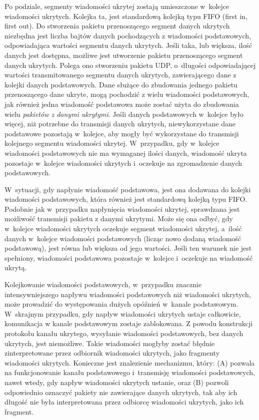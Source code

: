 \documentclass[a4paper, twoside, 12pt]{report}
\begin{document}
    Po podziale, segmenty wiadomości ukrytej zostają umieszczone w~kolejce wiadomości
    ukrytych. Kolejka ta, jest standardową kolejką typu FIFO (first in, first out).
    Do stworzenia pakietu przenoszącego segment danych ukrytych niezbędna jest
    liczba bajtów danych pochodzących z wiadomości podstawowych, odpowiadająca
    wartości segmentu danych ukrytych. Jeśli taka, lub większa, ilość danych jest dostępna,
    możliwe jest utworzenie pakietu przenoszącego segment danych ukrytych. Polega ono
    stworzeniu pakietu UDP, o~długości odpowiadającej wartości transmitowanego segmentu danych
    ukrytych, zawierającego dane z kolejki danych podstawowych. Dane służące do zbudowania
    jednego pakietu przenoszącego dane ukryte, mogą pochodzić z wielu wiadomości
    podstawowych, jak również jedna wiadomość podstawowa może zostać użyta do zbudowania
    wielu \emph{pakietów z danymi ukrytymi}. Jeśli danych podstawowych
    w~kolejce było więcej, niż potrzebne do transmisji danych ukrytych, niewykorzystane
    dane podstawowe pozostają w~kolejce, aby mogły być wykorzystane do transmisji
    kolejnego segmentu wiadomości ukrytej.
    W~przypadku, gdy w~kolejce wiadomości podstawowych nie ma wymaganej ilości
    danych, wiadomość ukryta pozostaje w~kolejce wiadomości ukrytych i~oczekuje
    na zgromadzenie danych podstawowych.

    W~sytuacji, gdy napłynie wiadomość podstawowa, jest ona dodawana do kolejki
    wiadomości podstawowych, która również jest standardową kolejką typu FIFO.
    Podobnie jak w~przypadku napłynięcia wiadomości ukrytej, sprawdzana jest możliwość
    transmisji pakietu z danymi ukrytymi. Może się ona odbyć, gdy w~kolejce wiadomości
    ukrytych oczekuje segment wiadomości ukrytej, a~ilość danych w~kolejce wiadomości
    podstawowych (licząc nowo dodaną wiadomość podstawową), jest równa lub większa
    od jego wartości. Jeśli ten warunek nie jest spełniony, wiadomości podstawowa
    pozostaje w~kolejce i~oczekuje na wiadomość ukrytą.

    Kolejkowanie wiadomości podstawowych, w~przypadku znacznie intensywniejszego
    napływu wiadomości podstawowych niż wiadomości ukrytych, może prowadzić do
    występowania dużych opóźnień w~kanale podstawowym. W~skrajnym przypadku,
    gdy napływ wiadomości ukrytych ustaje całkowicie, komunikacja w kanale podstawowym zostaje zablokowana.
    Z powodu konstrukcji protokołu kanału
    ukrytego, wysyłanie wiadomości podstawowych, bez danych ukrytych, jest niemożliwe.
    Takie wiadomości mogłyby zostać błędnie zinterpretowane przez odbiornik wiadomości
    ukrytych, jako fragmenty wiadomości ukrytych. Konieczne jest znalezienie mechanizmu,
    który: (A) pozwala na funkcjonowanie kanału podstawowego i~transmisję wiadomości
    podstawowych, nawet wtedy, gdy napływ wiadomości ukrytych ustanie, oraz (B)
    pozwoli odpowiednio oznaczyć pakiety nie zawierające danych ukrytych, tak aby ich długość
    nie była interpretowana przez odbiorcę wiadomości ukrytych, jako ich fragment.
\end{document}
